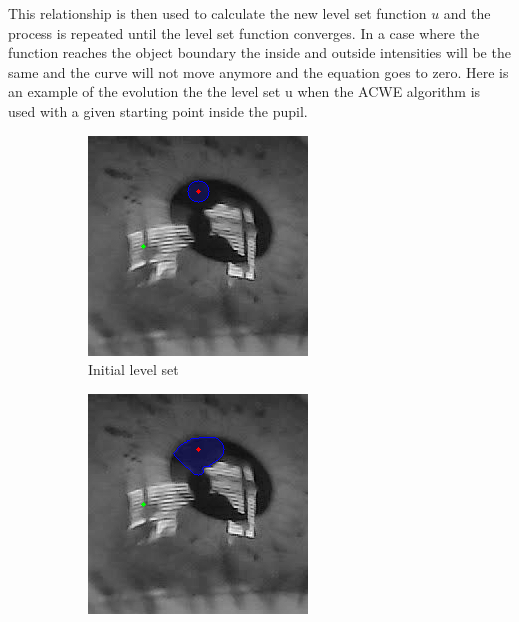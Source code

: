 This relationship is then used to calculate the new level set function $u$ and the process is repeated until the level set function converges. In a case where the function reaches the object boundary the inside and outside intensities will be the same and the curve will not move anymore and the equation goes to zero. 
Here is an example of the evolution the the level set u when the ACWE algorithm is used with a given starting point inside the pupil. 
\begin{figure}[h]
    \centering
    \begin{subfigure}{0.3\textwidth}
        \centering
        \includegraphics[width=0.9\linewidth]{plots/acwe/iteration_0.png}
        \caption{Initial level set}
    \end{subfigure}%
    \hfill
    \begin{subfigure}{0.3\textwidth}
        \centering
        \includegraphics[width=0.9\linewidth]{plots/acwe/iteration_15.png}

\end{subfigure}
\end{figure}
